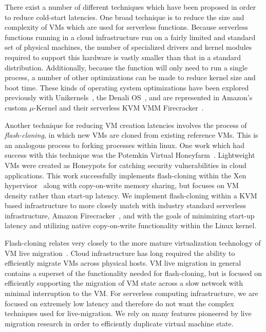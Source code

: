  There exist a number of different
techniques which have been proposed in order to reduce cold-start
latencies. One broad technique is to reduce the size and complexity of VMs
which are used for serverless functions. Because serverless functions running
in a cloud infrastructure run on a fairly limited and standard set of physical
machines, the number of specialized drivers and kernel modules required to
support this hardware is vastly smaller than that in a standard distribution.
Additionally, because the function will only need to run a single process, a
number of other optimizations can be made to reduce kernel size and boot time.
These kinds of operating system optimizations have been explored previously
with Unikernels~\cite{unikernels}, the Denali OS~\cite{denali}, and are
represented in Amazon's custom $\mu$-Kernel and their serverless KVM VMM
Firecracker~\cite{firecracker}.

Another technique for reducing VM creation latencies involves the process of
\emph{flash-cloning}, in which new VMs are cloned from existing reference VMs.
This is an analogous process to forking processes within linux. One work which
had success with this technique was the Potemkin Virtual
Honeyfarm~\cite{potemkin}. Lightweight VMs were created as Honeypots for
catching security vulnerabilities in cloud applications. This work successfully
implements flash-cloning within the Xen hypervisor~\cite{xen} along with
copy-on-write memory sharing, but focuses on VM density rather than start-up
latency. We implement flash-cloning within a KVM based infrastructure to more
closely match with industry standard serverless infrastructure, Amazon
Firecracker~\cite{firecracker}, and with the goals of minimizing start-up
latency and utilizing native copy-on-write functionality within the Linux
kernel.

 Flash-cloning relates very closely to the more
mature virtualization technology of VM live
migration~\cite{post-copy-migration}\cite{snowflock}. Cloud infrastructure has
long required the ability to efficiently migrate VMs across physical hosts. VM
live migration in general contains a superset of the functionality needed for
flash-cloning, but is focused on efficiently supporting the migration of VM
state across a slow network with minimal interruption to the VM. For serverless
computing infrastructure, we are focused on extremely low latency and therefore
do not want the complex techniques used for live-migration. We rely on many
features pioneered by live migration research in order to efficiently duplicate
virtual machine state.
